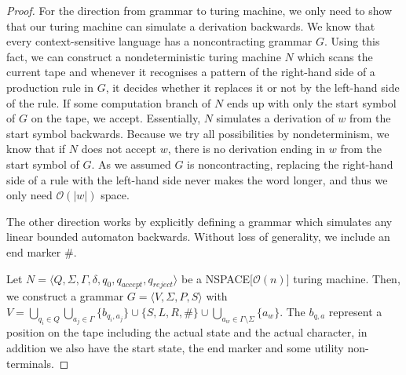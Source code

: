 \begin{proof}

    For the direction from grammar to turing machine, we only need to show that our turing machine can simulate a derivation backwards.
    We know that every context-sensitive language has a noncontracting grammar $G$.
    Using this fact, we can construct a nondeterministic turing machine $N$ which scans the current tape and whenever it recognises a pattern of the right-hand side of a production rule in $G$, it decides whether it replaces it or not by the left-hand side of the rule.
    If some computation branch of $N$ ends up with only the start symbol of $G$ on the tape, we accept.
    Essentially, $N$ simulates a derivation of $w$ from the start symbol backwards.
    Because we try all possibilities by nondeterminism, we know that if $N$ does not accept $w$, there is no derivation ending in $w$ from the start symbol of $G$.
    As we assumed $G$ is noncontracting, replacing the right-hand side of a rule with the left-hand side never makes the word longer, and thus we only need $\mathcal{O}(|w|)$ space.

    \vspace{5mm}

    The other direction works by explicitly defining a grammar which simulates any linear bounded automaton backwards.
    Without loss of generality, we include an end marker $\#$.

    Let $N = \langle Q, \Sigma, \Gamma, \delta, q_0, q_{accept}, q_{reject} \rangle$ be a NSPACE[$\mathcal{O}(n)$] turing machine.
    Then, we construct a grammar $G = \langle V, \Sigma, P, S \rangle$ with $V = \bigcup_{q_i \in Q} \bigcup_{a_j \in \Gamma} \{b_{q_i, a_j}\} \cup \{S, L, R, \#\} \cup \bigcup_{a_w \in \Gamma \setminus \Sigma} \{a_w\}$.
    The $b_{q, a}$ represent a position on the tape including the actual state and the actual character, in addition we also have the start state, the end marker and some utility non-terminals.


\end{proof}
